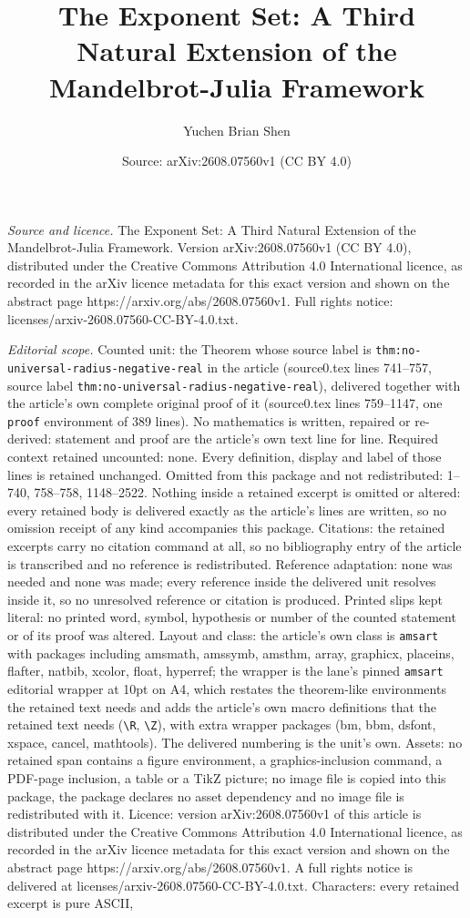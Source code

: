 \documentclass[10pt,a4paper]{amsart}
\title[The Exponent Set: A Third Natural Extension of the Mandelbro]{The Exponent Set: A Third Natural Extension of the Mandelbrot-Julia Framework}
\author{Yuchen Brian Shen}
\date{Source: arXiv:2608.07560v1 (CC BY 4.0)}
\begin{document}
\maketitle

\noindent\emph{Source and licence.} The Exponent Set: A Third Natural Extension of the Mandelbrot-Julia Framework. Version arXiv:2608.07560v1 (CC BY 4.0), distributed under the Creative Commons Attribution 4.0 International licence, as recorded in the arXiv licence metadata for this exact version and shown on the abstract page https://arxiv.org/abs/2608.07560v1. Full rights notice: licenses/arxiv-2608.07560-CC-BY-4.0.txt.\par\smallskip

\noindent\textit{Editorial scope.} Counted unit: the Theorem whose source label is \texttt{thm:no-universal-radius-negative-real} in the article (source0.tex lines 741--757, source label \texttt{thm:no-universal-radius-negative-real}), delivered together with the article's own complete original proof of it (source0.tex lines 759--1147, one \texttt{proof} environment of 389 lines). No mathematics is written, repaired or re-derived: statement and proof are the article's own text line for line. Required context retained uncounted: none. Every definition, display and label of those lines is retained unchanged. Omitted from this package and not redistributed: 1--740, 758--758, 1148--2522. Nothing inside a retained excerpt is omitted or altered: every retained body is delivered exactly as the article's lines are written, so no omission receipt of any kind accompanies this package. Citations: the retained excerpts carry no citation command at all, so no bibliography entry of the article is transcribed and no reference is redistributed. Reference adaptation: none was needed and none was made; every reference inside the delivered unit resolves inside it, so no unresolved reference or citation is produced. Printed slips kept literal: no printed word, symbol, hypothesis or number of the counted statement or of its proof was altered. Layout and class: the article's own class is \texttt{amsart} with packages including amsmath, amssymb, amsthm, array, graphicx, placeins, flafter, natbib, xcolor, float, hyperref; the wrapper is the lane's pinned \texttt{amsart} editorial wrapper at 10pt on A4, which restates the theorem-like environments the retained text needs and adds the article's own macro definitions that the retained text needs (\texttt{\textbackslash R}, \texttt{\textbackslash Z}), with extra wrapper packages (bm, bbm, dsfont, xspace, cancel, mathtools). The delivered numbering is the unit's own. Assets: no retained span contains a figure environment, a graphics-inclusion command, a PDF-page inclusion, a table or a TikZ picture; no image file is copied into this package, the package declares no asset dependency and no image file is redistributed with it. Licence: version arXiv:2608.07560v1 of this article is distributed under the Creative Commons Attribution 4.0 International licence, as recorded in the arXiv licence metadata for this exact version and shown on the abstract page https://arxiv.org/abs/2608.07560v1. A full rights notice is delivered at licenses/arxiv-2608.07560-CC-BY-4.0.txt. Characters: every retained excerpt is pure ASCII, 
\end{document}
